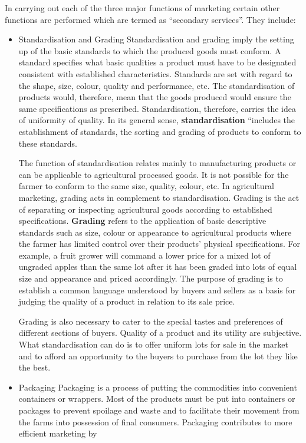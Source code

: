\documentclass[11pt,]{book}
\theoremstyle{definition}
\theoremstyle{definition}
\theoremstyle{definition}
\theoremstyle{remark}
\begin{document}
In carrying out each of the three major functions of marketing certain
other functions are performed which are termed as ``secondary
services''. They include:

\begin{itemize}
\item
  Standardisation and Grading \newline Standardisation and grading imply
  the setting up of the basic standards to which the produced goods must
  conform. A standard specifies what basic qualities a product must have
  to be designated consistent with established characteristics.
  Standards are set with regard to the shape, size, colour, quality and
  performance, etc. The standardisation of products would, therefore,
  mean that the goods produced would ensure the same specifications as
  prescribed. Standardisation, therefore, carries the idea of uniformity
  of quality. In its general sense, \textbf{standardisation} ``includes
  the establishment of standards, the sorting and grading of products to
  conform to these standards. \par  The function of standardisation
  relates mainly to manufacturing products or can be applicable to
  agricultural processed goods. It is not possible for the farmer to
  conform to the same size, quality, colour, etc. In agricultural
  marketing, grading acts in complement to standardisation. Grading is
  the act of separating or inspecting agricultural goods according to
  established specifications. \textbf{Grading} refers to the application
  of basic descriptive standards such as size, colour or appearance to
  agricultural products where the farmer has limited control over their
  products' physical specifications. For example, a fruit grower will
  command a lower price for a mixed lot of ungraded apples than the same
  lot after it has been graded into lots of equal size and appearance
  and priced accordingly. The purpose of grading is to establish a
  common language understood by buyers and sellers as a basis for
  judging the quality of a product in relation to its sale price. \par
  Grading is also necessary to cater to the special tastes and
  preferences of different sections of buyers. Quality of a product and
  its utility are subjective. What standardisation can do is to offer
  uniform lots for sale in the market and to afford an opportunity to
  the buyers to purchase from the lot they like the best.
\item
  Packaging \newline Packaging is a process of putting the commodities
  into convenient containers or wrappers. Most of the products must be
  put into containers or packages to prevent spoilage and waste and to
  facilitate their movement from the farms into possession of final
  consumers. Packaging contributes to more efficient marketing by
\end{itemize}
\end{document}
